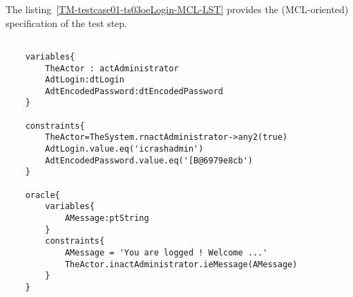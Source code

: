 	
	
		
	\vspace{1cm}
	The listing~\ref{TM-testcase01-ts03oeLogin-MCL-LST} provides the \msrmessir (MCL-oriented) specification of the test step.
	
	\scriptsize
	\vspace{0.5cm}
	\begin{lstlisting}[style=MessirStyle,firstnumber=auto,captionpos=b,caption={\msrmessir (MCL-oriented) specification of the test step \emph{testcase01-ts03oeLogin}.},label=TM-testcase01-ts03oeLogin-MCL-LST]

	variables{
		TheActor : actAdministrator
		AdtLogin:dtLogin
		AdtEncodedPassword:dtEncodedPassword
	}
	
	constraints{
		TheActor=TheSystem.rnactAdministrator->any2(true)
		AdtLogin.value.eq('icrashadmin')
		AdtEncodedPassword.value.eq('[B@6979e8cb')
	}
	
	oracle{
		variables{
			AMessage:ptString
		}
		constraints{
			AMessage = 'You are logged ! Welcome ...'
			TheActor.inactAdministrator.ieMessage(AMessage)
		}
	}
	
	\end{lstlisting}
	\normalsize 
	
	
